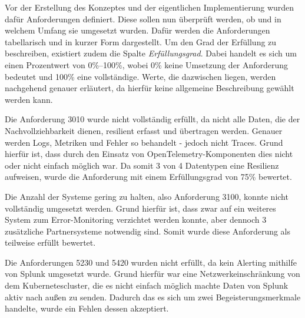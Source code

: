 
Vor der Erstellung des Konzeptes und der eigentlichen Implementierung wurden dafür Anforderungen definiert. Diese sollen nun überprüft werden, ob und in welchem Umfang sie umgesetzt wurden. Dafür werden die Anforderungen tabellarisch und in kurzer Form dargestellt. Um den Grad der Erfüllung zu beschreiben, existiert zudem die Spalte \textit{Erfüllungsgrad}. Dabei handelt es sich um einen Prozentwert von 0\%--100\%, wobei 0\% keine Umsetzung der Anforderung bedeutet und 100\% eine vollständige. Werte, die dazwischen liegen, werden nachgehend genauer erläutert, da hierfür keine allgemeine Beschreibung gewählt werden kann.
	


Die Anforderung 3010 wurde nicht vollständig erfüllt, da nicht alle Daten, die der Nachvollziehbarkeit dienen, resilient erfasst und übertragen werden. Genauer werden Logs, Metriken und Fehler so behandelt - jedoch nicht Traces. Grund hierfür ist, dass durch den Einsatz von OpenTelemetry-Komponenten dies nicht oder nicht einfach möglich war. Da somit 3 von 4 Datentypen eine Resilienz aufweisen, wurde die Anforderung mit einem Erfüllungsgrad von 75\% bewertet.

Die Anzahl der Systeme gering zu halten, also Anforderung 3100, konnte nicht vollständig umgesetzt werden. Grund hierfür ist, dass zwar auf ein weiteres System zum Error-Monitoring verzichtet werden konnte, aber dennoch 3 zusätzliche Partnersysteme notwendig sind. Somit wurde diese Anforderung als teilweise erfüllt bewertet.

Die Anforderungen 5230 und 5420 wurden nicht erfüllt, da kein Alerting mithilfe von Splunk umgesetzt wurde. Grund hierfür war eine Netzwerkeinschränkung von dem Kuber\-netes\-cluster, die es nicht einfach möglich machte Daten von Splunk aktiv nach außen zu senden. Dadurch das es sich um zwei Begeisterungsmerkmale handelte, wurde ein Fehlen dessen akzeptiert.